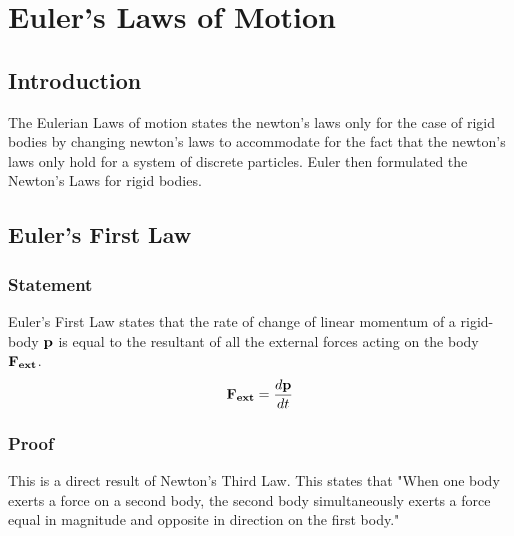 \documentclass{article}
\begin{document}
\section{Euler's Laws of Motion}
\subsection{Introduction}
The Eulerian Laws of motion states the newton's laws only for the case of rigid bodies by changing newton's laws to accommodate for the fact that the newton's laws only hold for a system of discrete particles. Euler then formulated the Newton's Laws for rigid bodies.
\subsection{Euler's First Law}
\subsubsection{Statement}
\begin{example*}
    Euler's First Law states that the rate of change of linear momentum of a rigid-body $\vb{p}$ is equal to the resultant of all the external forces acting on the body $\vb{F_{ext}}$.
\begin{align*}
    \vb{F_{ext}} = \frac{d\vb{p}}{dt}
\end{align*}
\end{example*}
\subsubsection{Proof}
This is a direct result of Newton's Third Law. This states that "When one body exerts a force on a second body, the second body simultaneously exerts a force equal in magnitude and opposite in direction on the first body."
\end{document}

